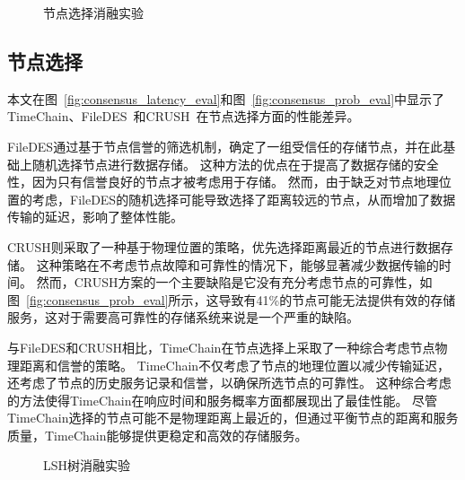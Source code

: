 \begin{figure*}[t]
    \centering
    \begin{minipage}{0.9\linewidth}
        \quad
        \caption{节点选择消融实验} 
    \end{minipage}
\end{figure*}

\subsection{节点选择}
本文在图~\autoref{fig:consensus_latency_eval}和图~\autoref{fig:consensus_prob_eval}中显示了TimeChain、FileDES~\cite{xu2024filedes}和CRUSH~\cite{weil2006ceph}在节点选择方面的性能差异。

FileDES通过基于节点信誉的筛选机制，确定了一组受信任的存储节点，并在此基础上随机选择节点进行数据存储。
这种方法的优点在于提高了数据存储的安全性，因为只有信誉良好的节点才被考虑用于存储。
然而，由于缺乏对节点地理位置的考虑，FileDES的随机选择可能导致选择了距离较远的节点，从而增加了数据传输的延迟，影响了整体性能。

CRUSH则采取了一种基于物理位置的策略，优先选择距离最近的节点进行数据存储。
这种策略在不考虑节点故障和可靠性的情况下，能够显著减少数据传输的时间。
然而，CRUSH方案的一个主要缺陷是它没有充分考虑节点的可靠性，如图~\autoref{fig:consensus_prob_eval}所示，这导致有41\%的节点可能无法提供有效的存储服务，这对于需要高可靠性的存储系统来说是一个严重的缺陷。

与FileDES和CRUSH相比，TimeChain在节点选择上采取了一种综合考虑节点物理距离和信誉的策略。
TimeChain不仅考虑了节点的地理位置以减少传输延迟，还考虑了节点的历史服务记录和信誉，以确保所选节点的可靠性。
这种综合考虑的方法使得TimeChain在响应时间和服务概率方面都展现出了最佳性能。
尽管TimeChain选择的节点可能不是物理距离上最近的，但通过平衡节点的距离和服务质量，TimeChain能够提供更稳定和高效的存储服务。

\begin{figure*}[t]
    \centering
    \begin{minipage}{0.9\linewidth}
        \quad
        \caption{LSH树消融实验} 
    \end{minipage}
\end{figure*}

